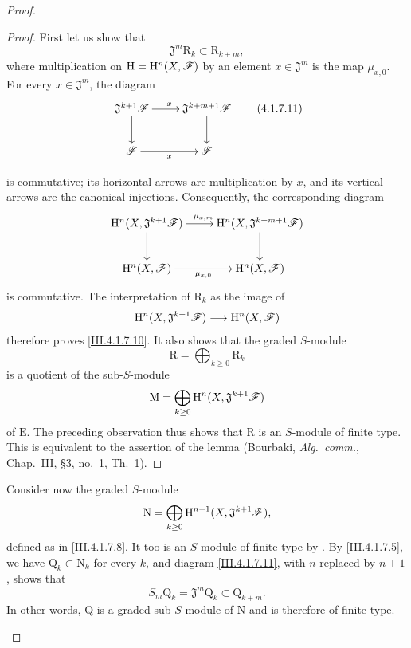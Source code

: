 \begin{proof}
\begin{proof}
First let us show that
\[
  \mathfrak{J}^m\mathrm{R}_k
  \subset
  \mathrm{R}_{k+m},
  \tag{4.1.7.10}
  \label{III.4.1.7.10}
\]
where multiplication on
$\mathrm{H}=\mathrm{H}^n(X,\mathscr{F})$ by an element
$x\in\mathfrak{J}^m$ is the map $\mu_{x,0}$.
For every $x\in\mathfrak{J}^m$, the diagram
\[
  \xymatrix{
    \mathfrak{J}^{k+1}\sh{F}
      \ar[r]^{x}\ar[d]
    &
    \mathfrak{J}^{k+m+1}\sh{F}
      \ar[d]
    \\
    \sh{F}
      \ar[r]_{x}
    &
    \sh{F}
  }
  \tag{4.1.7.11}
  \label{III.4.1.7.11}
\]


is commutative; its horizontal arrows are multiplication by $x$, and
its vertical arrows are the canonical injections.
Consequently, the corresponding diagram
\[
  \xymatrix{
    \HH^n(X,\mathfrak{J}^{k+1}\sh{F})
      \ar[r]^{\mu_{x,m}}\ar[d]
    &
    \HH^n(X,\mathfrak{J}^{k+m+1}\sh{F})
      \ar[d]
    \\
    \HH^n(X,\sh{F})
      \ar[r]_{\mu_{x,0}}
    &
    \HH^n(X,\sh{F})
  }
\]
is commutative.
The interpretation of $\mathrm{R}_k$ as the image of
\[
  \mathrm{H}^n(X,\mathfrak{J}^{k+1}\mathscr{F})
  \longrightarrow
  \mathrm{H}^n(X,\mathscr{F})
\]
therefore proves \eqref{III.4.1.7.10}.
It also shows that the graded $S$-module
\[
  \mathrm{R}=\bigoplus_{k\geq0}\mathrm{R}_k
\]
is a quotient of the sub-$S$-module
\[
  \mathrm{M}
  =
  \bigoplus_{k\geq0}
  \mathrm{H}^n(X,\mathfrak{J}^{k+1}\mathscr{F})
\]
of $\mathrm{E}$.
The preceding observation thus shows that $\mathrm{R}$ is an
$S$-module of finite type.
This is equivalent to the assertion of the lemma
(Bourbaki, \emph{Alg.\ comm.}, Chap.~III, \S3, no.~1, Th.~1).
\end{proof}

\begin{env}[4.1.7.12]
\label{III.4.1.7.12}
Consider now the graded $S$-module
\[
  \mathrm{N}
  =
  \bigoplus_{k\geq0}
  \mathrm{H}^{n+1}(X,\mathfrak{J}^{k+1}\mathscr{F}),
\]
defined as in \eqref{III.4.1.7.8}.
It too is an $S$-module of finite type by .
By \eqref{III.4.1.7.5}, we have
$\mathrm{Q}_k\subset\mathrm{N}_k$ for every $k$, and diagram
\eqref{III.4.1.7.11}, with $n$ replaced by $n+1$, shows that
\[
  S_m\mathrm{Q}_k
  =
  \mathfrak{J}^m\mathrm{Q}_k
  \subset
  \mathrm{Q}_{k+m}.
\]
In other words, $\mathrm{Q}$ is a graded sub-$S$-module of
$\mathrm{N}$ and is therefore of finite type.
\end{env}


\end{proof}
